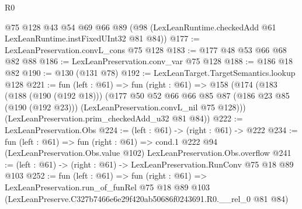 \begin{lexlean}{R0}
\begin{coremodule}
    @75
    @128
    @43
    @54
    @69
    @66
    @89
    (@98 (LexLeanRuntime.checkedAdd @61 LexLeanRuntime.instFixedUInt32 @81 @84))
@177 := LexLeanPreservation.convL_cons @75 @128
@183 := @177 @48 @53 @66 @68 @82 @88
@186 := LexLeanPreservation.conv_var @75 @128
@188 := @186 @18 @82
@190 := @130 (@131 @78)
@192 := LexLeanTarget.TargetSemantics.lookup @128
@221 := fun (left : @61) =>
  fun (right : @61) =>
  @158
    (@174
      (@183
        (@188 (@190 (@192 @18)))
        (@177
          @50
          @52
          @66
          @66
          @85
          @87
          (@186 @23 @85 (@190 (@192 @23)))
          (LexLeanPreservation.convL_nil @75 @128)))
      (LexLeanPreservation.prim_checkedAdd_u32 @81 @84))
@222 := LexLeanPreservation.Obs
@224 := (left : @61) -> (right : @61) -> @222
@234 := fun (left : @61) =>
  fun (right : @61) =>
  cond.{1} @222 @94 (LexLeanPreservation.Obs.value @102) LexLeanPreservation.Obs.overflow
@241 := (left : @61) -> (right : @61) -> LexLeanPreservation.RunConv @75 @18 @89 @103
@252 := fun (left : @61) =>
  fun (right : @61) =>
  LexLeanPreservation.run_of_funRel
    @75
    @18
    @89
    @103
    (LexLeanPreserve.C327b7466e6e29f420ab50686f0243691.R0.__rel_0 @81 @84)
\end{coremodule}
\end{lexlean}
